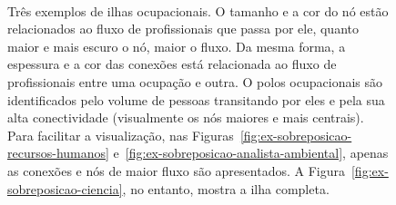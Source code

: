 \documentclass[
  article,
  11pt,
  a4paper,
  english,
  brazil,
  sumario=tradicional]{abntex2}
\begin{document}
\begin{figure}[ht]
    \centering
    \\    
    \caption{Três exemplos de ilhas ocupacionais. O tamanho e a cor do nó estão relacionados ao fluxo de profissionais que passa por ele, quanto maior e mais escuro o nó, maior o fluxo. Da mesma forma, a espessura e a cor das conexões está relacionada ao fluxo de profissionais entre uma ocupação e outra. O polos ocupacionais são identificados pelo volume de pessoas transitando por eles e pela sua alta conectividade (visualmente os nós maiores e mais centrais). Para facilitar a visualização, nas Figuras~\ref{fig:ex-sobreposicao-recursos-humanos} e~\ref{fig:ex-sobreposicao-analista-ambiental}, apenas as conexões e nós de maior fluxo são apresentados. A Figura~\ref{fig:ex-sobreposicao-ciencia}, no entanto, mostra a ilha completa.}
    \label{fig:ex-ilhas-ocupacionais}
\end{figure}
\end{document}
